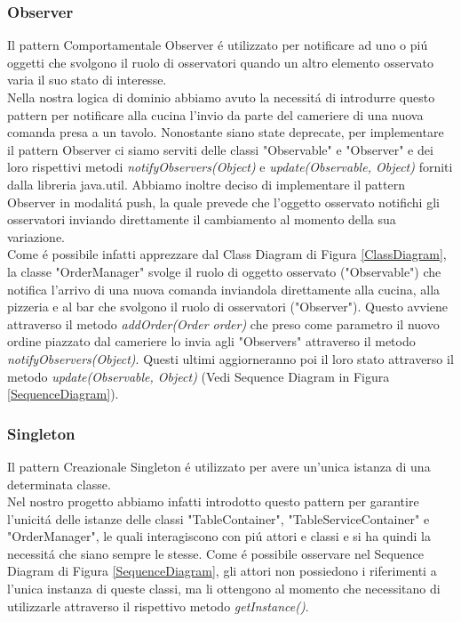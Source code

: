 \documentclass{article}
\begin{document}
\subsubsection{Observer}

Il pattern Comportamentale Observer \'e utilizzato per notificare ad uno o pi\'u oggetti che svolgono il ruolo di osservatori quando un altro elemento osservato varia il suo stato di interesse. \\
Nella nostra logica di dominio abbiamo avuto la necessit\'a di introdurre questo pattern per notificare alla cucina l'invio da parte del cameriere di una nuova comanda presa a un tavolo. Nonostante siano state deprecate, per implementare il pattern Observer ci siamo serviti delle classi "Observable" e "Observer" e dei loro rispettivi metodi \textit{notifyObservers(Object)} e \textit{update(Observable, Object)} forniti dalla libreria java.util. Abbiamo inoltre deciso di implementare il pattern Observer in modalit\'a push, la quale prevede che l'oggetto osservato notifichi gli osservatori inviando direttamente il cambiamento al momento della sua variazione. \\ Come \'e possibile infatti apprezzare dal Class Diagram di Figura \ref{ClassDiagram}, la classe "OrderManager" svolge il ruolo di oggetto osservato ("Observable") che notifica l'arrivo di una nuova comanda inviandola direttamente alla cucina, alla pizzeria e al bar che svolgono il ruolo di osservatori ("Observer"). Questo avviene attraverso il metodo \textit{addOrder(Order order)} che preso come parametro il nuovo ordine piazzato dal cameriere lo invia agli "Observers" attraverso il metodo \textit{notifyObservers(Object)}. Questi ultimi aggiorneranno poi il loro stato attraverso il metodo \textit{update(Observable, Object)} (Vedi Sequence Diagram in Figura \ref{SequenceDiagram}).

\newpage

\subsubsection{Singleton}

Il pattern Creazionale Singleton \'e utilizzato per avere un'unica istanza di una determinata classe. \\
Nel nostro progetto abbiamo infatti introdotto questo pattern per garantire l'unicit\'a delle istanze delle classi "TableContainer", "TableServiceContainer" e "OrderManager", le quali interagiscono con pi\'u attori e classi e si ha quindi la necessit\'a che siano sempre le stesse. Come \'e possibile osservare nel Sequence Diagram di Figura \ref{SequenceDiagram}, gli attori non possiedono i riferimenti a l'unica instanza di queste classi, ma li ottengono al momento che necessitano di utilizzarle attraverso il rispettivo metodo \textit{getInstance()}.
\end{document}
